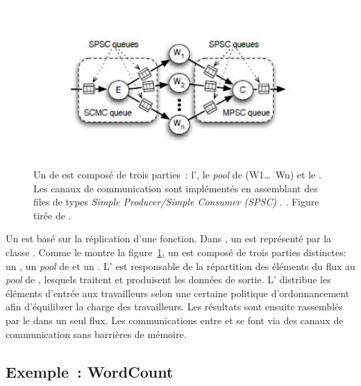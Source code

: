 \begin{figure}[ht]
\centering
     \includegraphics[width=1.0\textwidth]{Figures/FastFlowFarm.jpg}
      \caption{Un  de  est compos\'e de trois parties~:  l', le \emph{pool} de  (W1\ldots\ Wn) et le . Les canaux de communication sont impl\'ement\'es en assemblant des files de types \emph{Simple Producer/Simple Consumer (SPSC)} . . Figure tir\'ee de \cite{aldinucci2010efficient}.}
       \label{FastFlowFarm.fig}
\end{figure}

Un  est bas\'e sur la r\'eplication d'une fonction. Dans , un  est repr\'esent\'e par la classe . Comme le montre la figure~\ref{FastFlowFarm.fig}, un  est compos\'e de trois parties distinctes: un , un  \emph{pool} de  et un . L' est responsable de la r\'epartition des \'el\'ements du flux au \emph{pool} de , lesquels traitent et produisent les donn\'ees de sortie. L' distribue les \'el\'ements d'entr\'ee aux travailleurs selon une certaine politique d'ordonnancement afin d'\'equilibrer la charge des travailleurs. Les r\'esultats sont ensuite rassembl\'es par le  dans un seul flux. Les communications entre  et  se font via des canaux de communication sans barri\`eres de m\'emoire.


\subsection{Exemple~: WordCount}


